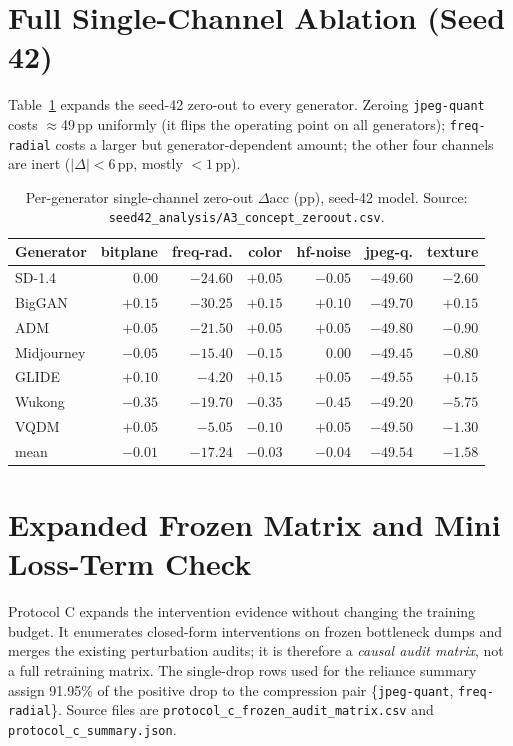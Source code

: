 \section{Full Single-Channel Ablation (Seed 42)}
\label{app:ablation}

Table~\ref{tab:full-ablation} expands the seed-42 zero-out to every generator. Zeroing
\texttt{jpeg-quant} costs $\approx$49\,pp uniformly (it flips the operating point on all
generators); \texttt{freq-radial} costs a larger but generator-dependent amount; the other
four channels are inert ($|\Delta|<6$\,pp, mostly $<1$\,pp).

\begin{table}[h]
  \centering
  \caption{Per-generator single-channel zero-out $\Delta$acc (pp), seed-42 model. Source:
    \texttt{seed42\_analysis/A3\_concept\_zeroout.csv}.}
  \label{tab:full-ablation}
  \small
  \begin{tabular}{lrrrrrr}
    \toprule
    Generator & bitplane & freq-rad. & color & hf-noise & jpeg-q. & texture \\
    \midrule
    SD-1.4     & $0.00$  & $-24.60$ & $+0.05$ & $-0.05$ & $-49.60$ & $-2.60$ \\
    BigGAN     & $+0.15$ & $-30.25$ & $+0.15$ & $+0.10$ & $-49.70$ & $+0.15$ \\
    ADM        & $+0.05$ & $-21.50$ & $+0.05$ & $+0.05$ & $-49.80$ & $-0.90$ \\
    Midjourney & $-0.05$ & $-15.40$ & $-0.15$ & $0.00$  & $-49.45$ & $-0.80$ \\
    GLIDE      & $+0.10$ & $-4.20$  & $+0.15$ & $+0.05$ & $-49.55$ & $+0.15$ \\
    Wukong     & $-0.35$ & $-19.70$ & $-0.35$ & $-0.45$ & $-49.20$ & $-5.75$ \\
    VQDM       & $+0.05$ & $-5.05$  & $-0.10$ & $+0.05$ & $-49.50$ & $-1.30$ \\
    \midrule
    mean       & $-0.01$ & $-17.24$ & $-0.03$ & $-0.04$ & $-49.54$ & $-1.58$ \\
    \bottomrule
  \end{tabular}
\end{table}

\section{Expanded Frozen Matrix and Mini Loss-Term Check}
\label{app:protocol-cd}

Protocol C expands the intervention evidence without changing the training budget. It enumerates
closed-form interventions on frozen bottleneck dumps and merges the existing perturbation audits;
it is therefore a \emph{causal audit matrix}, not a full retraining matrix. The single-drop rows
used for the reliance summary assign 91.95\% of the positive drop to the compression pair
\{\texttt{jpeg-quant}, \texttt{freq-radial}\}. Source files are
\texttt{protocol\_c\_frozen\_audit\_matrix.csv} and \texttt{protocol\_c\_summary.json}.

